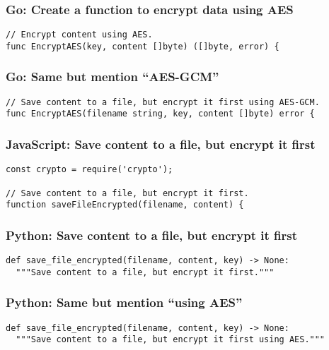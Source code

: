 \documentclass[sigplan,screen,nonacm]{acmart}
\begin{document}
\subsubsection{Go: Create a function to encrypt data using AES}
\begin{verbatim}
// Encrypt content using AES.
func EncryptAES(key, content []byte) ([]byte, error) {
\end{verbatim}

\subsubsection{Go: Same but mention ``AES-GCM''}
\begin{verbatim}
// Save content to a file, but encrypt it first using AES-GCM.
func EncryptAES(filename string, key, content []byte) error {
\end{verbatim}

\subsubsection{JavaScript: Save content to a file, but encrypt it first}
\begin{verbatim}
const crypto = require('crypto');

// Save content to a file, but encrypt it first.
function saveFileEncrypted(filename, content) {
\end{verbatim}

\balance 

\subsubsection{Python: Save content to a file, but encrypt it first}

\begin{verbatim}
def save_file_encrypted(filename, content, key) -> None:
  """Save content to a file, but encrypt it first."""
\end{verbatim}

\subsubsection{Python: Same but mention ``using AES''}

\begin{verbatim}
def save_file_encrypted(filename, content, key) -> None:
  """Save content to a file, but encrypt it first using AES."""
\end{verbatim}
\end{document}
